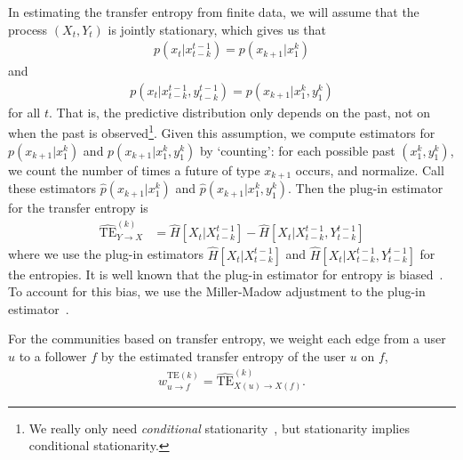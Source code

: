 In estimating the transfer entropy from finite data, we will assume that the process $(X_{t}, Y_{t})$ is jointly stationary, which gives us that
\begin{align}
	p(x_{t} | x_{t-k}^{t-1}) = p(x_{k+1} | x_{1}^{k})
\end{align}
and
\begin{align}
	p(x_{t} | x_{t-k}^{t-1}, y_{t-k}^{t-1}) = p(x_{k+1} | x_{1}^{k}, y_{1}^{k})
\end{align}
for all $t$. That is, the predictive distribution only depends on the past, not on when the past is observed\footnote{We really only need \emph{conditional} stationarity~\cite{caires2003nonparametric}, but stationarity implies conditional stationarity.}. Given this assumption, we compute estimators for $p(x_{k+1} | x_{1}^{k})$ and $p(x_{k+1} | x_{1}^{k}, y_{1}^{k})$ by `counting': for each possible past $(x_{1}^{k}, y_{1}^{k})$, we count the number of times a future of type $x_{k+1}$ occurs, and normalize. Call these estimators $\hat{p}(x_{k+1} | x_{1}^{k})$ and $\hat{p}(x_{k+1} | x_{1}^{k}, y_{1}^{k})$. Then the plug-in estimator for the transfer entropy is
\begin{align}
	\widehat{\text{TE}}_{Y \to X}^{(k)} &= \hat{H}\left[X_{t} | X_{t-k}^{t-1}\right] - \hat{H}\left[X_{t} | X_{t-k}^{t-1}, Y_{t-k}^{t-1}\right]
\end{align}
where we use the plug-in estimators $\hat{H}\left[X_{t} | X_{t-k}^{t-1}\right]$ and $\hat{H}\left[X_{t} | X_{t-k}^{t-1}, Y_{t-k}^{t-1}\right]$ for the entropies. It is well known that the plug-in estimator for entropy is biased~\cite{paninski2003estimation}. To account for this bias, we use the Miller-Madow adjustment to the plug-in estimator~\cite{miller1955note}.

For the communities based on transfer entropy, we weight each edge from a user $u$ to a follower $f$ by the estimated transfer entropy of the user $u$ on $f$, 
\begin{align}
\label{Eqn-EW-activity}
	w_{u \to f}^{\text{TE}(k)} = \widehat{\text{TE}}_{X(u) \to X(f)}^{(k)}.
\end{align}

